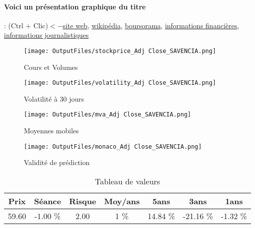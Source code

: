 \documentclass[11pt,a4paper]{report}%
\begin{document}
\paragraph{Voici un présentation graphique du titre} : (Ctrl + Clic)$<-$\href{https://www.savencia-fromagedairy.com/informations-financieres/}{site web}, \href{https://fr.wikipedia.org/wiki/Savencia_Fromage_%26_Dairy}{wikipédia}, \href{https://www.boursorama.com/cours/1rPSAVE}{boursorama}, \href{https://www.qwant.com/?q=site:https:%2f%2fwww.easybourse.com%2faction-societe%2fSAVENCIA&t=web&client=ext-firefox-hp}{informations financières}, \href{https://bourse.lerevenu.com/cours-de-bourse/fiche-valeur-synthese/SAVENCIA/SAVE-FR}{informations journalistiques}
\begin{figure}[!htb]
   \begin{minipage}{0.5\textwidth}
     \centering
     \texttt{[image: OutputFiles/stockprice\_Adj Close\_SAVENCIA.png]}
     \caption{Cours et Volumes}\label{Fig:price_SAVENCIA}
   \end{minipage}\hfill
   \begin{minipage}{0.5\textwidth}
     \centering
     \texttt{[image: OutputFiles/volatility\_Adj Close\_SAVENCIA.png]}
     \caption{Volatilité à 30 jours}\label{Fig:volat_SAVENCIA}
   \end{minipage}
\end{figure}
\begin{figure}[!htb]
   \begin{minipage}{0.5\textwidth}
     \centering
     \texttt{[image: OutputFiles/mva\_Adj Close\_SAVENCIA.png]}
     \caption{Moyennes mobiles}\label{Fig:mva_SAVENCIA}
   \end{minipage}\hfill
   \begin{minipage}{0.5\textwidth}
     \centering
     \texttt{[image: OutputFiles/monaco\_Adj Close\_SAVENCIA.png]}
     \caption{Validité de prédiction}\label{Fig:prediction_SAVENCIA}
   \end{minipage}
\end{figure}

\begin{table}[H]
  \centering
    \begin{tabular}{|c|c|c|c|c|c|c|}
    \hline
    Prix & Séance & Risque  & Moy/ans & 5ans & 3ans & 1ans \\
    \hline
    59.60 &    -1.00 \%    & 2.00 & 1 \% & 14.84 \% & -21.16 \% & -1.32 \% \\
    \hline
    \end{tabular}%
        \label{tab:table_SAVENCIA}%
      \caption{Tableau de valeurs}
\end{table}%
\end{document}
